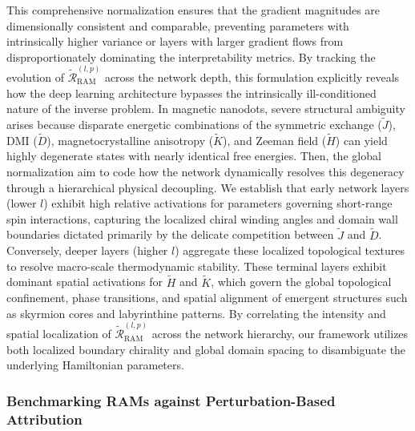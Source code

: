 \documentclass[letterpaper, 12, one column]{article}
\begin{document}
This comprehensive normalization ensures that the gradient magnitudes are dimensionally consistent and comparable, preventing parameters with intrinsically higher variance or layers with larger gradient flows from disproportionately dominating the interpretability metrics. By tracking the evolution of $\tilde{\mathcal{R}}_{\text{RAM}}^{(l,p)}$ across the network depth, this formulation explicitly reveals how the deep learning architecture bypasses the intrinsically ill-conditioned nature of the inverse problem. In magnetic nanodots, severe structural ambiguity arises because disparate energetic combinations of the symmetric exchange ($\tilde{J}$), DMI ($\tilde{D}$), magnetocrystalline anisotropy ($\tilde{K}$), and Zeeman field ($\tilde{H}$) can yield highly degenerate states with nearly identical free energies. Then, the global normalization aim to code how the network dynamically resolves this degeneracy through a hierarchical physical decoupling. We establish that early network layers (lower $l$) exhibit high relative activations for parameters governing short-range spin interactions, capturing the localized chiral winding angles and domain wall boundaries dictated primarily by the delicate competition between $\tilde{J}$ and $\tilde{D}$. Conversely, deeper layers (higher $l$) aggregate these localized topological textures to resolve macro-scale thermodynamic stability. These terminal layers exhibit dominant spatial activations for $\tilde{H}$ and $\tilde{K}$, which govern the global topological confinement, phase transitions, and spatial alignment of emergent structures such as skyrmion cores and labyrinthine patterns. By correlating the intensity and spatial localization of $\tilde{\mathcal{R}}_{\text{RAM}}^{(l,p)}$ across the network hierarchy, our framework utilizes both localized boundary chirality and global domain spacing to disambiguate the underlying Hamiltonian parameters.

\subsubsection{Benchmarking RAMs against Perturbation-Based Attribution}\label{sec:rams_benchmark}
\end{document}
